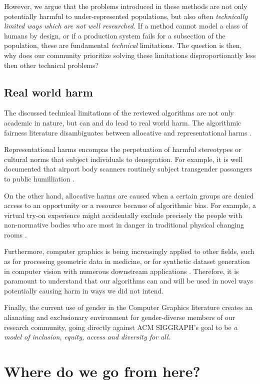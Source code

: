 \documentclass[nonacm,sigconf,review,balance=false]{acmart}
\begin{document}
However, we argue that the problems introduced in these methods are not only potentially harmful to under-represented populations, but also often \emph{technically limited ways which are not well researched}. If a method cannot model a class of humans by design, or if a production system fails for a subsection of the population, these are fundamental \emph{technical} limitations. The question is then, why does our community prioritize solving these limitations disproportionatly less then other technical problems?

\subsection{Real world harm}

The discussed technical limitations of the reviewed algorithms are not only academic in nature, but can and do lead to real world harm. The algorithmic fairness literature disambiguates between allocative and representational harms .

Representational harms encompas the perpetuation of harmful stereotypes or cultural norms that subject individuals to denegration. For example, it is well documented that airport body scanners routinely subject transgender passangers to public humilliation \cite{tsa}.

On the other hand, allocative harms are caused when a certain groups are denied access to an opportunity or a resource because of algorithmic bias. For example, a virtual try-on experience  might accidentally exclude precisely the people with non-normative bodies who are most in danger in traditional physical changing rooms \cite{changingroom}.

Furthermore, computer graphics is being increasingly applied to other fields, such as for processing geometric data in medicine, or for synthetic dataset generation in computer vision with numerous downstream applications \cite{cars, chen2021synthetic, dhs}. Therefore, it is paramount to understand that our algorithms can and will be used in novel ways potentially causing harm in ways we did not intend.

Finally, the current use of gender in the Computer Graphics literature creates an alianating and exclusionary environment for gender-diverse members of our research community, going directly against ACM SIGGRAPH's goal to be \emph{a model of inclusion, equity, access and diversity for all}.

\section{Where do we go from here?}
\end{document}
